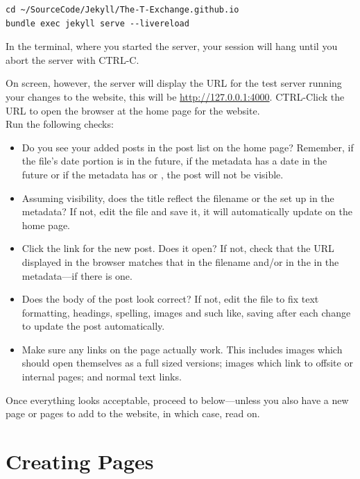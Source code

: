 \begin{lstlisting}[style=myText]
cd ~/SourceCode/Jekyll/The-T-Exchange.github.io
bundle exec jekyll serve --livereload
\end{lstlisting}

In the terminal, where you started the server, your session will hang until you abort the server with CTRL-C.

On screen, however, the server will display the URL for the test server running your changes to the website, this will be \url{http://127.0.0.1:4000}. CTRL-Click the URL to open the browser at the home page for the website.\\

Run the following checks:

\begin{itemize}
    \item Do you see your added posts in the post list on the home page? Remember, if the file's date portion is in the future, if the metadata has a date in the future or if the metadata has  or , the post will not be visible.
    \item Assuming visibility, does the title reflect the filename or the  set up in the metadata? If not, edit the file and save it, it will automatically update on the home page.
    \item Click the link for the new post. Does it open? If not, check that the URL displayed in the browser matches that in the filename and/or in the  in the metadata---if there is one.
    \item Does the body of the post look correct? If not, edit the file to fix text formatting, headings, spelling, images and such like, saving after each change to update the post automatically.
    \item Make sure any links on the page actually work. This includes images which should open themselves as a full sized versions; images which link to offsite or internal pages; and normal text links.
\end{itemize}

Once everything looks acceptable, proceed to  below---unless you also have a new page or pages to add to the website, in which case, read on.


\section{Creating Pages}

